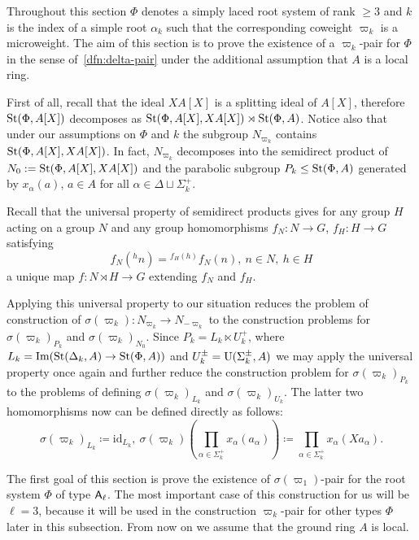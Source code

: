 Throughout this section $\Phi$ denotes a simply laced root system of rank $\geq 3$ and $k$ is the index of
 a simple root $\alpha_k$ such that the corresponding coweight $\varpi_k$ is a microweight.
The aim of this section is to prove the existence of a $\varpi_k$-pair for $\Phi$ in the sense of~\cref{dfn:delta-pair}
 under the additional assumption that $A$ is a local ring.

First of all, recall that the ideal $XA[X]$ is a splitting ideal of $A[X]$, therefore
$\operatorname{St}(\Phi, A[X])$ decomposes as $\operatorname{St}(\Phi, A[X], XA[X]) \rtimes \operatorname{St}(\Phi, A)$.
Notice also that under our assumptions on $\Phi$ and $k$ the subgroup $N_{\varpi_k}$ contains $\operatorname{St}(\Phi, A[X], XA[X])$.
In fact, $N_{\varpi_k}$ decomposes into the semidirect product of $N_0 := \operatorname{St}(\Phi, A[X], XA[X])$ and the parabolic subgroup $P_k \leq \operatorname{St}(\Phi, A)$
generated by $x_\alpha(a)$, $a \in A$ for all $\alpha \in \Delta \sqcup \Sigma^+_k$.

Recall that the universal property of semidirect products gives for any group $H$ acting on a group $N$
and any group homomorphisms $f_N\colon N \to G$, $f_H\colon H \to G$ satisfying
\begin{equation}
    \label{eq:coherence-condition} f_N({}^hn) = {}^{f_H(h)} f_N(n),\ n\in N,\ h\in H
\end{equation}
a unique map $f\colon N \rtimes H \to G$ extending $f_N$ and $f_H$.

Applying this universal property to our situation reduces the problem of construction of $\sigma(\varpi_k) \colon N_{\varpi_k} \to N_{-\varpi_k}$
to the construction problems for $\sigma(\varpi_k)_{P_k}$ and $\sigma(\varpi_k)_{N_0}$.
Since $P_k = L_k \ltimes U_k^+$, where $L_k = \mathrm{Im}(\operatorname{St}(\Delta_k, A) \to \operatorname{St}(\Phi, A))$
and $U_k^\pm = \operatorname{U}(\Sigma_k^\pm, A)$ we may apply the universal property once again and further reduce the construction problem for $\sigma(\varpi_k)_{P_k}$
to the problems of defining $\sigma(\varpi_k)_{L_k}$ and $\sigma(\varpi_k)_{U_k}$.
The latter two homomorphisms now can be defined directly as follows:
\[\sigma(\varpi_k)_{L_k} \coloneqq \mathrm{id}_{L_k},\ \sigma(\varpi_k)\left(\prod\limits_{\alpha \in \Sigma_k^+} x_\alpha(a_\alpha)\right) \coloneqq \prod\limits_{\alpha \in \Sigma_k^+} x_\alpha(Xa_\alpha).\]

The first goal of this section is prove the existence of $\sigma(\varpi_1)$-pair for the root system $\Phi$ of type $\mathsf{A}_\ell$.
The most important case of this construction for us will be $\ell = 3$, because it will be used in the construction $\varpi_k$-pair for other types $\Phi$ later in this subsection.
From now on we assume that the ground ring $A$ is local.

